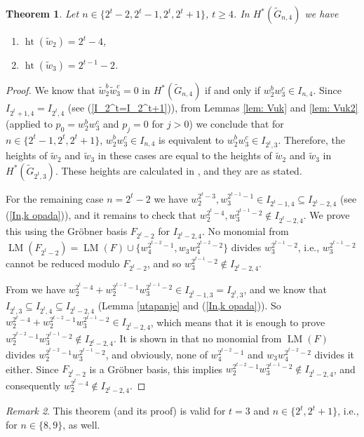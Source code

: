 \documentclass{amsart}
\newtheorem{theorem}{Theorem}[section]
\theoremstyle{definition}
\theoremstyle{remark}
\newtheorem{remark}[theorem]{Remark}
\numberwithin{equation}{section}
\newcommand{\gr}{\widetilde G}
\newcommand{\w}{\widetilde w}
\newcommand{\lm}{\operatorname{LM}}
\newcommand{\htt}{\operatorname{ht}}
\renewcommand{\ge}{\geqslant}
\begin{document}
\label{sec:heights}
\label{sec:3}

\begin{theorem}\label{prop:ht}
    Let $n\in\{2^t-2,2^t-1,2^t,2^t+1\}$, $t\ge4$. In $H^*(\gr_{n,4})$ we have
    \begin{enumerate}
        \item $\htt(\w_2) = 2^t-4$,
        \item $\htt(\w_3) = 2^{t-1}-2$.
    \end{enumerate}
    \end{theorem}
    \begin{proof}
    We know that $\w_2^b\w_3^c=0$ in $H^*(\gr_{n,4})$ if and only if $w_2^bw_3^c\in I_{n,4}$. Since $I_{2^t+1,4}=I_{2^t,4}$ (see (\ref{I_2^t=I_2^t+1})), from
    Lemmas \ref{lem: Vuk} and \ref{lem: Vuk2} (applied to $p_0=w_2^bw_3^c$ and $p_j=0$ for $j>0$) we conclude that for $n\in\{2^t-1,2^t,2^t+1\}$, $w_2^bw_3^c\in I_{n,4}$ is equivalent to $w_2^bw_3^c\in I_{2^t,3}$. Therefore, the heights of $\w_2$ and $\w_3$ in these cases are equal to the heights of $\w_2$ and $\w_3$ in $H^*(\gr_{2^t,3})$.
    These heights are calculated in \cite[Theorems 1.2 and 1.3]{CP-cl}, and they are as stated.

    \medskip

    For the remaining case $n=2^t-2$ we have $w_2^{2^t-3},w_3^{2^{t-1}-1}\in I_{2^t-1,4}\subseteq I_{2^t-2,4}$ (see (\ref{In,k opada})), and it remains to check that $w_2^{2^t-4},w_3^{2^{t-1}-2}\notin I_{2^t-2,4}$. We prove this using the Gr\"obner basis $F_{2^t-2}$ for $I_{2^t-2,4}$. No monomial from $\lm(F_{2^t-2})=\lm(F)\cup\big\{w_4^{2^{t-2}-1},w_3w_4^{2^{t-2}-2}\big\}$ divides $w_3^{2^{t-1}-2}$, i.e., $w_3^{2^{t-1}-2}$ cannot be reduced modulo $F_{2^t-2}$, and so $w_3^{2^{t-1}-2}\notin I_{2^t-2,4}$. 

    From \cite[(4.3)]{CP-cl} we have $w_2^{2^t-4}+w_2^{2^{t-2}-1}w_3^{2^{t-1}-2}\in I_{2^t-1,3}=I_{2^t,3}$, and we know that $I_{2^t,3}\subseteq I_{2^t,4}\subseteq I_{2^t-2,4}$ (Lemma \ref{utapanje} and (\ref{In,k opada})). So $w_2^{2^t-4}+w_2^{2^{t-2}-1}w_3^{2^{t-1}-2}\in I_{2^t-2,4}$, which means that it is enough to prove $w_2^{2^{t-2}-1}w_3^{2^{t-1}-2}\notin I_{2^t-2,4}$. It is shown in \cite[p.\ 277]{CP-cl} that no monomial from $\lm(F)$ divides $w_2^{2^{t-2}-1}w_3^{2^{t-1}-2}$, and obviously, none of $w_4^{2^{t-2}-1}$ and $w_3w_4^{2^{t-2}-2}$ divides it either. Since $F_{2^t-2}$ is a Gr\"obner basis, this implies $w_2^{2^{t-2}-1}w_3^{2^{t-1}-2}\notin I_{2^t-2,4}$, and consequently $w_2^{2^t-4}\notin I_{2^t-2,4}$.
    \end{proof}
\begin{remark}
    This theorem (and its proof) is valid for $t=3$ and $n \in \{2^t,2^t+1\}$, i.e., for $n\in\{8,9\}$, as well.
\end{remark}
\end{document}
